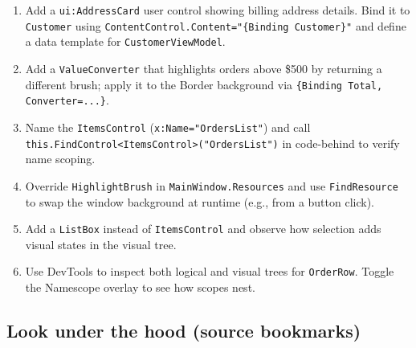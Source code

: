\begin{enumerate}
\def\labelenumi{\arabic{enumi}.}
\tightlist
\item
  Add a \passthrough{\lstinline!ui:AddressCard!} user control showing
  billing address details. Bind it to \passthrough{\lstinline!Customer!}
  using
  \passthrough{\lstinline!ContentControl.Content="\{Binding Customer\}"!}
  and define a data template for
  \passthrough{\lstinline!CustomerViewModel!}.
\item
  Add a \passthrough{\lstinline!ValueConverter!} that highlights orders
  above \$500 by returning a different brush; apply it to the Border
  background via
  \passthrough{\lstinline!\{Binding Total, Converter=...\}!}.
\item
  Name the \passthrough{\lstinline!ItemsControl!}
  (\passthrough{\lstinline!x:Name="OrdersList"!}) and call
  \passthrough{\lstinline!this.FindControl<ItemsControl>("OrdersList")!}
  in code-behind to verify name scoping.
\item
  Override \passthrough{\lstinline!HighlightBrush!} in
  \passthrough{\lstinline!MainWindow.Resources!} and use
  \passthrough{\lstinline!FindResource!} to swap the window background
  at runtime (e.g., from a button click).
\item
  Add a \passthrough{\lstinline!ListBox!} instead of
  \passthrough{\lstinline!ItemsControl!} and observe how selection adds
  visual states in the visual tree.
\item
  Use DevTools to inspect both logical and visual trees for
  \passthrough{\lstinline!OrderRow!}. Toggle the Namescope overlay to
  see how scopes nest.
\end{enumerate}

\subsection{Look under the hood (source
bookmarks)}\label{look-under-the-hood-source-bookmarks-1}

